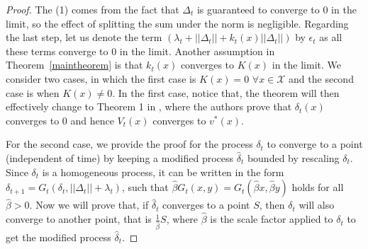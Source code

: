 \documentclass[jair, twoside,11pt,theapa]{article}
\newtheorem{lemm}{Lemma}
\begin{document}
\begin{proof}
The (1) comes from the fact that $\Delta_t$ is guaranteed to converge to 0 in the limit, so the effect of splitting the sum under the norm is negligible. Regarding the last step, let us denote the term $(\lambda_t + ||\Delta_t|| + k_t(x) ||\Delta_t|| )$ by $\epsilon_t$ as all these terms converge to 0 in the limit. Another assumption in Theorem~\ref{maintheorem} is that $k_t(x)$ converges to $K(x)$ in the limit. We consider two cases, in which the first case is $K(x) = 0$  $\forall x \in \mathcal{X}$ and the second case is when $K(x) \neq 0$. In the first case, notice that, the theorem will then effectively change to Theorem 1 in  \citet{szepesvari1999unified}, where the authors prove that $\delta_t(x)$ converges to 0 and hence $V_t(x)$ converges to $v^*(x)$.



For the second case, we provide the proof for the process $\delta_t$ to converge to a point (independent of time) by keeping a modified process $\hat{\delta}_t$ bounded by rescaling $\delta_t$. Since $\delta_t$ is a homogeneous process, it can be written in the form $\delta_{t+1} = G_t(\delta_t, ||\Delta_t|| + \lambda_t)$, such that $\hat{\beta} G_t(x,y) = G_t(\hat{\beta} x, \hat{\beta} y)$ holds for all $\hat{\beta}>0$. Now we will prove that, if $\hat{\delta}_t$ converges to a point $S$, then $\delta_t$ will also converge to another point, that is $\frac{1}{\hat{\beta}}S$, where $\hat{\beta}$ is the scale factor applied to $\delta_t$ to get the modified process  $\hat{\delta}_t$. 






\end{proof}
\end{document}
